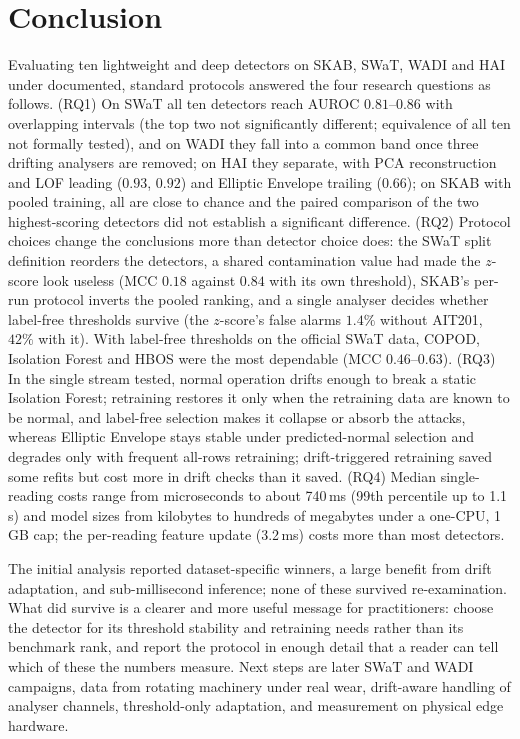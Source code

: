 \documentclass[11pt]{article}
\begin{document}
\section{Conclusion}
\label{sec:conclusion}

Evaluating ten lightweight and deep detectors on SKAB, SWaT, WADI and HAI under
documented, standard protocols answered the four research questions as follows.
(RQ1) On SWaT all ten detectors reach AUROC $0.81$--$0.86$ with overlapping intervals
(the top two not significantly different; equivalence of all ten not formally tested),
and on WADI they fall into a common band once three drifting analysers are removed; on HAI
they separate, with PCA reconstruction and LOF leading ($0.93$, $0.92$) and Elliptic
Envelope trailing ($0.66$); on SKAB with pooled training, all are close to chance and
the paired comparison of the two highest-scoring detectors did not establish a
significant difference. (RQ2) Protocol choices change the conclusions more than detector choice does:
the SWaT split definition reorders the detectors, a shared contamination value had made
the $z$-score look useless (MCC $0.18$ against $0.84$ with its own threshold), SKAB's
per-run protocol inverts the pooled ranking, and a single analyser decides whether
label-free thresholds survive (the $z$-score's false alarms $1.4\%$ without AIT201,
$42\%$ with it). With label-free thresholds on the official SWaT data, COPOD, Isolation
Forest and HBOS were the most dependable (MCC $0.46$--$0.63$). (RQ3) In the single stream tested, normal operation drifts enough to break a static
Isolation Forest; retraining restores it only when the retraining data are known to be
normal, and label-free selection makes it collapse or absorb the attacks, whereas
Elliptic Envelope stays stable under predicted-normal selection and degrades only with
frequent all-rows retraining; drift-triggered retraining saved some refits but cost more
in drift checks than it saved. (RQ4) Median single-reading costs range from
microseconds to about 740\,ms (99th percentile up to 1.1\,s) and model sizes from kilobytes to hundreds of megabytes
under a one-CPU, 1\,GB cap; the per-reading feature update (3.2\,ms) costs more than
most detectors.

The initial analysis reported dataset-specific winners, a large
benefit from drift adaptation, and sub-millisecond inference; none of these
survived re-examination. What did survive is a clearer and more useful message for
practitioners: choose the detector for its threshold stability and retraining
needs rather than its benchmark rank, and report the protocol in enough detail
that a reader can tell which of these the numbers measure. Next steps are later SWaT
and WADI campaigns, data from rotating machinery under real wear, drift-aware
handling of analyser channels, threshold-only adaptation, and measurement on physical
edge hardware.
\end{document}
